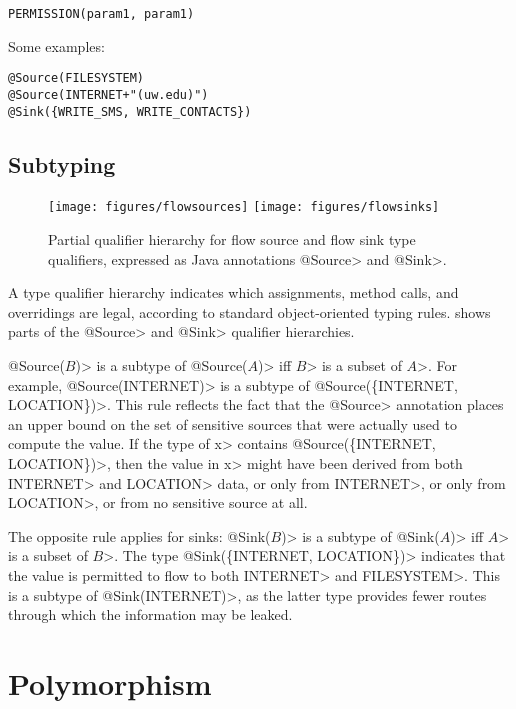 \begin{Verbatim}
PERMISSION(param1, param1)
\end{Verbatim}

Some examples:

\begin{Verbatim}
@Source(FILESYSTEM)
@Source(INTERNET+"(uw.edu)")
@Sink({WRITE_SMS, WRITE_CONTACTS})
\end{Verbatim}

\subsection{Subtyping\label{sec:subtyping}}

\begin{figure}
\centerline{\texttt{[image: figures/flowsources]}%
  \hfill%
  \texttt{[image: figures/flowsinks]}}
\caption{Partial qualifier hierarchy for flow source and flow sink type
  qualifiers, expressed as Java annotations \<@Source> and \<@Sink>.}
\label{fig:flow-hierarchy}
\end{figure}


A type qualifier hierarchy indicates
which assignments, method calls, and overridings are legal, according to
standard object-oriented typing rules.
 shows parts of the \<@Source> and
\<@Sink> qualifier hierarchies.


\<@Source($B$)> is a subtype of \<@Source($A$)> iff \<$B$> is a subset of \<$A$>.
For example, \<@Source(INTERNET)> is a subtype of \<@Source(\{INTERNET, LOCATION\})>.
This rule reflects the fact that the \<@Source> annotation
places an upper bound on the set of sensitive sources that were actually
used to compute the value.
If the type of \<x> contains \<@Source(\{INTERNET, LOCATION\})>, then the value
in \<x> might have been derived from both \<INTERNET> and \<LOCATION> data, or
only from \<INTERNET>, or only from \<LOCATION>, or from no
sensitive source at all.

The opposite rule applies for sinks:
\<@Sink($B$)> is a subtype of \<@Sink($A$)> iff \<$A$> is a subset of \<$B$>.
The type \<@Sink(\{INTERNET, LOCATION\})> indicates that
the value is permitted to flow to both \<INTERNET> and \<FILESYSTEM>.  This
is a subtype of \<@Sink(INTERNET)>, as the latter type provides fewer routes through which the information may be
leaked.

\section{Polymorphism \label{sec:polyflowsources}}



